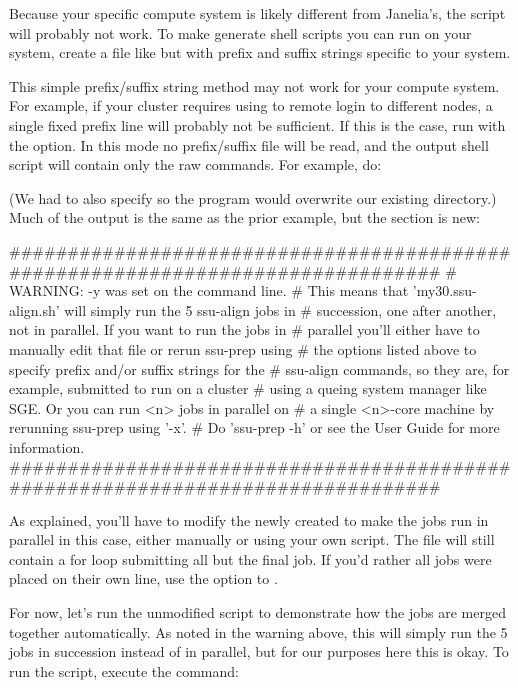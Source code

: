 Because your specific compute system is likely different from
Janelia's, the  script will probably not
work. To make  generate shell scripts you can run on
your system, create a file like  but
with prefix and suffix strings specific to your
system. 

This simple prefix/suffix string method may not work for your
compute system. For example, if your cluster requires using 
to remote login to different nodes, a single fixed prefix line will
probably not be sufficient. If this is the case, run 
with the  option. In this mode no prefix/suffix file
will be read, and the output shell script will contain only the raw
 commands. For example, do:


(We had to also specify  so the program would overwrite our
existing  directory.) Much of the output is the same as the
prior example, but the  section is new:

\begin{sreoutput}
################################################################################
# WARNING: -y was set on the command line.
# This means that 'my30.ssu-align.sh' will simply run the 5 ssu-align jobs in
# succession, one after another, not in parallel. If you want to run the jobs in
# parallel you'll either have to manually edit that file or rerun ssu-prep using
# the options listed above to specify prefix and/or suffix strings for the
# ssu-align commands, so they are, for example, submitted to run on a cluster
# using a queing system manager like SGE. Or you can run <n> jobs in parallel on
# a single <n>-core machine by rerunning ssu-prep using '-x'.
# Do 'ssu-prep -h' or see the User Guide for more information.
################################################################################
\end{sreoutput}

As explained, you'll have to modify the newly created
 to make the jobs run in parallel in this
case, either manually or using your own script. The file will still
contain a for loop submitting all but the final job. If you'd rather
all jobs were placed on their own line, use the 
option to .

For now, let's run the unmodified  script to
demonstrate how the jobs are merged together automatically. As noted
in the warning above, this will simply run the 5 jobs in succession
instead of in parallel, but for our purposes here this is okay. To run
the script, execute the command: 

